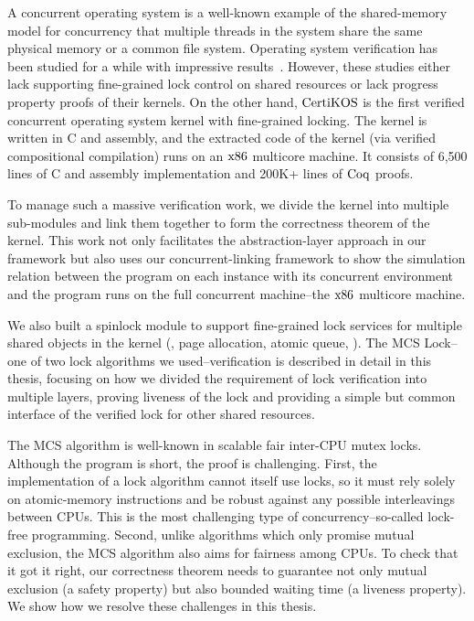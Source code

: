 A concurrent operating system is a well-known example of the shared-memory model for concurrency that multiple threads 
in the system share the same physical memory or a common 
file system. Operating system verification has been studied for a while with impressive results~\cite{klein2009sel4, xu16, hawblitzel10}.
However, these studies either lack supporting fine-grained lock control on shared resources or lack progress property proofs of their kernels.
 On the other hand, $\mathrm{CertiKOS}$ is the first verified concurrent operating system kernel with fine-grained locking. 
 The kernel is written in C and assembly, and the extracted code of the kernel (via verified compositional compilation) 
 runs on an $\mathrm{x86}$ multicore machine. It consists of 6,500 lines of C and assembly implementation and 200K+ lines of $\mathrm{Coq}$ proofs.

To manage such a massive verification work, we divide the kernel into multiple sub-modules and link them together to form the 
correctness theorem of the kernel. This work not only facilitates the abstraction-layer approach in our framework 
but also uses our concurrent-linking framework to show the simulation relation between 
the program on each instance with its concurrent environment and the program runs on the full 
concurrent machine--the $\mathrm{x86}$ multicore machine. 

We also built a spinlock module to support fine-grained lock services for multiple shared objects in the kernel 
(\ie, page allocation, atomic queue, \etc).
The MCS Lock--one of two lock algorithms we used--verification is described in detail in this thesis, 
focusing on how we divided the requirement of lock verification into multiple layers, proving
liveness of the lock and providing a simple but common interface of the verified lock for other shared resources.

The MCS algorithm is well-known in scalable fair inter-CPU mutex locks. 
Although the program is short, the proof is challenging. First, the implementation of a lock algorithm cannot itself use locks, 
so it must rely solely on atomic-memory instructions and be robust against any possible interleavings between CPUs. 
This is the most challenging type of concurrency--so-called lock-free programming.
Second, unlike algorithms which only promise mutual exclusion, the MCS algorithm also aims for fairness among CPUs.
To check that it got it right, our correctness theorem needs to guarantee not only mutual exclusion (a safety property) but also bounded waiting time (a liveness property). We show how we resolve these challenges in this thesis.


